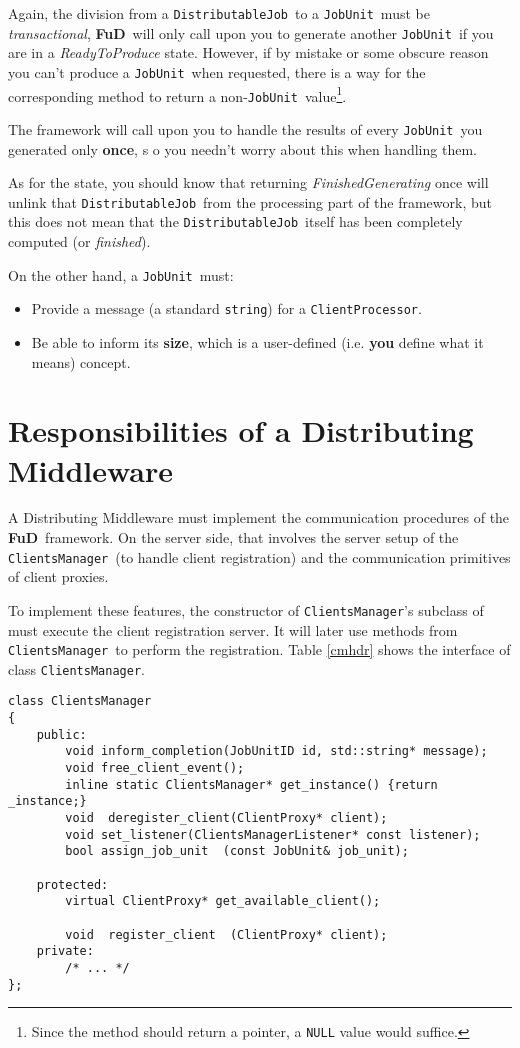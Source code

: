 \documentclass[a4paper,12pt,english]{article}
\newcommand{\fud}{\textbf{FuD}}
\renewcommand{\DJ}{\texttt{DistributableJob}}
\newcommand{\JU}{\texttt{JobUnit}}
\newcommand{\CP}{\texttt{ClientProcessor}}
\newcommand{\CM}{\texttt{ClientsManager}}
\begin{document}
Again, the division from a \DJ \ to a \JU \ must be \emph{transactional}, \fud \ will only call upon you to generate another \JU \ if you are in a \emph{ReadyToProduce} state. However, if by mistake or some obscure reason you can't produce a \JU \ when requested, there is a way for the corresponding method to return a non-\JU \ value\footnote{Since the method should return a pointer, a \texttt{NULL} value would suffice.}. 

The framework will call upon you to  handle the results of every \JU \ you generated only \textbf{once}, s  o you needn't worry about this when handling them.

As for the state, you should know that returning \emph{FinishedGenerating} once will unlink that \DJ \ from the processing part of the framework, but this does not mean that the \DJ \ itself has been completely computed (or \emph{finished}). 

On the other hand, a \JU \ must:
\begin{itemize}
\item Provide a message (a standard \texttt{string}) for a \CP.
\item Be able to inform its \textbf{size}, which is a user-defined (i.e. \textbf{you} define what it means) concept.
\end{itemize}

\section{Responsibilities of a Distributing Middleware}

A Distributing Middleware must implement the communication procedures of the \fud \ framework. On the server side, that involves the server setup of the \CM \ (to handle client registration) and the communication primitives of client proxies. 

To implement these features, the constructor of \CM's subclass of must execute the client registration server. It will later use methods from \CM \ to perform the registration. Table \ref{cmhdr} shows the interface of class \CM. 

\begin{table}[!htb]
\lstset{language=C++}%
\begin{lstlisting}[frame=single]
class ClientsManager
{
    public:
        void inform_completion(JobUnitID id, std::string* message);
        void free_client_event();
        inline static ClientsManager* get_instance() {return _instance;}
        void  deregister_client(ClientProxy* client);
        void set_listener(ClientsManagerListener* const listener);
        bool assign_job_unit  (const JobUnit& job_unit);

    protected:
        virtual ClientProxy* get_available_client();

        void  register_client  (ClientProxy* client);
    private:
        /* ... */
};
\end{lstlisting}
\centering \caption{Excerpt from class \CM.} \label{cmhdr}
\end{table}
\end{document}
